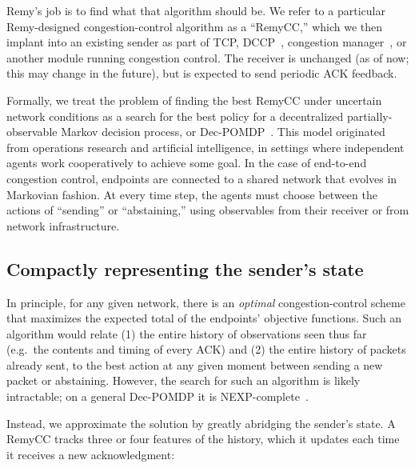 Remy's job is to find what that algorithm should
be.  We refer to a particular Remy-designed congestion-control
algorithm as a ``RemyCC,'' which we then implant into an existing
sender as part of TCP, DCCP~\cite{dccp}, congestion manager~\cite{cm},
or another module running congestion control.  The receiver is
unchanged (as of now; this may change in the future), but is expected
to send periodic ACK feedback.

Formally, we treat the problem of finding the best RemyCC under
uncertain network conditions as a search for the best policy for a
decentralized partially-observable Markov decision
process, or Dec-POMDP~\cite{Oliehoek2012}. This model originated from operations
research and artificial intelligence, in settings where independent
agents work cooperatively to achieve some goal. In the case of
end-to-end congestion control, endpoints are connected to a shared
network that evolves in Markovian fashion. At every time step, the
agents must choose between the actions of ``sending'' or
``abstaining,'' using observables from their receiver or from network
infrastructure.

\subsection{Compactly representing the sender's state}
\label{ss:signals}
In principle, for any given network, there is an {\em optimal}
congestion-control scheme that maximizes the expected total of the
endpoints' objective functions. Such an algorithm would relate (1) the
entire history of observations seen thus far (e.g.~the
contents and timing of every ACK) and (2) the entire history of
packets already sent, to the best action at any given moment between sending a new packet or abstaining. However, the search for such an algorithm is likely
intractable; on a general Dec-POMDP it is
NEXP-complete~\cite{Bernstein2002}.

Instead, we approximate the solution by greatly abridging the sender's
state. A RemyCC tracks three or four features of the history, which it
updates each time it receives a new acknowledgment:


